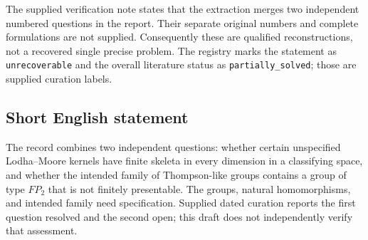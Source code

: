 \documentclass[11pt]{article}
\begin{document}
The supplied verification note states that the extraction merges two independent numbered questions in the report. Their separate original numbers and complete formulations are not supplied. Consequently these are qualified reconstructions, not a recovered single precise problem. The registry marks the statement as \texttt{unrecoverable} and the overall literature status as \texttt{partially\_solved}; those are supplied curation labels.
\subsection{Short English statement}
The record combines two independent questions: whether certain unspecified Lodha--Moore kernels have finite skeleta in every dimension in a classifying space, and whether the intended family of Thompson-like groups contains a group of type \(FP_2\) that is not finitely presentable. The groups, natural homomorphisms, and intended family need specification. Supplied dated curation reports the first question resolved and the second open; this draft does not independently verify that assessment.
\end{document}
